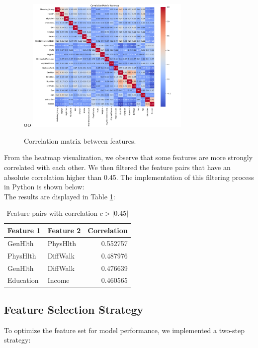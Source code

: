 

\begin{figure}[H]
    \centering
oo    \includegraphics[width=0.7\textwidth]{images/diabetes_correlation_matrix.png}
    \caption{Correlation matrix between features.}
    \label{fig:correlation-matrix}
\end{figure}

From the heatmap visualization, we observe that some features are more strongly correlated with each other. We then filtered the feature pairs that have an absolute correlation higher than 0.45. The implementation of this filtering process in Python is shown below:
\\


The results are displayed in Table \ref{table:correlation-filtered}:

\begin{table}[ht]
\centering
\begin{tabular}{ |l|l|r| }
\hline
\textbf{Feature 1} & \textbf{Feature 2} & \textbf{Correlation} \\
\hline
GenHlth    & PhysHlth   & 0.552757 \\
PhysHlth   & DiffWalk   & 0.487976 \\
GenHlth    & DiffWalk   & 0.476639 \\
Education  & Income     & 0.460565 \\
\hline
\end{tabular}
\caption{Feature pairs with correlation $c > |0.45|$}
\label{table:correlation-filtered}
\end{table}

\subsection*{Feature Selection Strategy}
To optimize the feature set for model performance, we implemented a two-step strategy:

